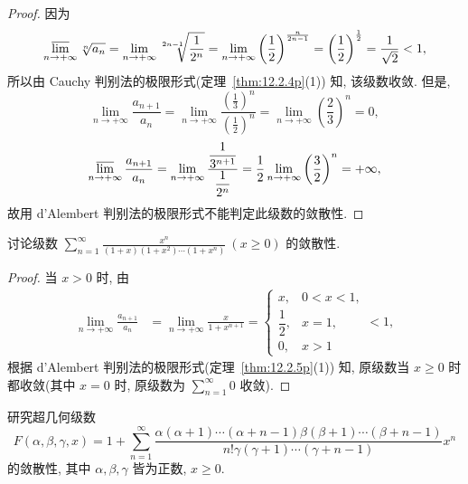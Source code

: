 \begin{proof}
因为
\[
  \varlimsup_{n\to+\infty}\sqrt[n]{a_{n}}
  =\lim_{n\to+\infty}\sqrt[2n-1]{\frac{1}{2^{n}}}
  =\lim_{n\to+\infty}\left(\frac{1}{2}\right)^{\frac{n}{2n-1}}
  =\left(\frac{1}{2}\right)^{\frac{1}{2}}
  =\frac{1}{\sqrt{2}}<1,
\]
所以由 Cauchy 判别法的极限形式(定理~\ref{thm:12.2.4p}(1)) 知, 该级数收敛. 但是,
\[
  \lim_{n\to+\infty}\frac{a_{n+1}}{a_{n}}
  =\lim_{n\to+\infty}\frac{\left(\frac{1}{3}\right)^{n}}{\left(\frac{1}{2}\right)^{n}}
  =\lim_{n\to+\infty}\left(\frac{2}{3}\right)^{n}=0,
\]
\[
  \varlimsup_{n\to+\infty}\frac{a_{n+1}}{a_{n}}
  =\lim_{n\to+\infty}\frac{\dfrac{1}{3^{n+1}}}{\dfrac{1}{2^{n}}}
  =\frac{1}{2}\lim_{n\to+\infty}\left(\frac{3}{2}\right)^{n}=+\infty,
\]
故用 d'Alembert 判别法的极限形式不能判定此级数的敛散性.
\end{proof}

\begin{example}\label{ex:12.2.15}
讨论级数 $\sum_{n=1}^{\infty}\frac{x^{n}}{(1+x)(1+x^{2})\cdots(1+x^{n})}\ (x\geqslant0)$ 的敛散性.
\end{example}

\begin{proof}
当 $x>0$ 时, 由
\begin{align*}
  \lim_{n\to+\infty}\frac{a_{n+1}}{a_{n}}
  &=\lim_{n\to+\infty}\frac{x}{1+x^{n+1}}
   =\begin{cases}
   x, & 0<x<1,\\[
2pt]
   \dfrac{1}{2}, & x=1,\\[2pt]
   0, & x>1
   \end{cases} <1,
\end{align*}
根据 d'Alembert 判别法的极限形式(定理~\ref{thm:12.2.5p}(1)) 知, 原级数当 $x\geqslant0$ 时都收敛(其中 $x=0$ 时, 原级数为 $\sum_{n=1}^{\infty}0$ 收敛).
\end{proof}
\begin{example}\label{ex:12.2.16}
研究超几何级数
\[
  F(\alpha,\beta,\gamma,x)=1+\sum_{n=1}^{\infty}
  \frac{\alpha(\alpha+1)\cdots(\alpha+n-1)\beta(\beta+1)\cdots(\beta+n-1)}
       {n!\gamma(\gamma+1)\cdots(\gamma+n-1)}x^{n}
\]
的敛散性, 其中 $\alpha,\beta,\gamma$ 皆为正数, $x\geqslant0$.
\end{example}

